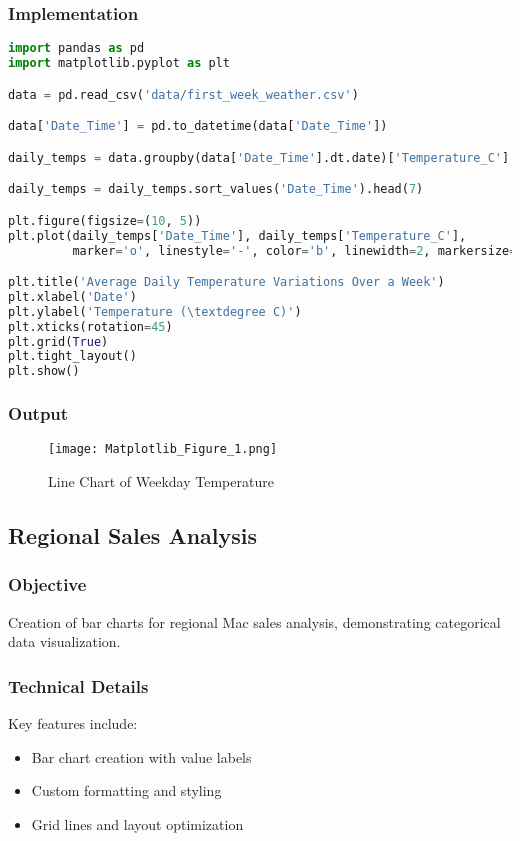 \documentclass[12pt]{article}
\begin{document}
\subsubsection{Implementation}
\begin{lstlisting}[language=Python, caption=Temperature Analysis Implementation]
import pandas as pd
import matplotlib.pyplot as plt

data = pd.read_csv('data/first_week_weather.csv')

data['Date_Time'] = pd.to_datetime(data['Date_Time'])

daily_temps = data.groupby(data['Date_Time'].dt.date)['Temperature_C'].mean().reset_index()

daily_temps = daily_temps.sort_values('Date_Time').head(7)

plt.figure(figsize=(10, 5))
plt.plot(daily_temps['Date_Time'], daily_temps['Temperature_C'], 
         marker='o', linestyle='-', color='b', linewidth=2, markersize=8)

plt.title('Average Daily Temperature Variations Over a Week')
plt.xlabel('Date')
plt.ylabel('Temperature (\textdegree C)')
plt.xticks(rotation=45)
plt.grid(True)
plt.tight_layout()
plt.show()

\end{lstlisting}
\newpage
\subsubsection{Output}
\begin{figure}[h]
    \centering
    \texttt{[image: Matplotlib\_Figure\_1.png]}
    \caption{Line Chart of Weekday Temperature}
    \label{fig:enter-label}
\end{figure}

\subsection{Regional Sales Analysis\hfill\href{https://github.com/sabbirahmed404/Python-Practice/blob/main/matplotlib_2.py}{\faGithub}}
\subsubsection{Objective}
Creation of bar charts for regional Mac sales analysis, demonstrating categorical data visualization.

\subsubsection{Technical Details}
Key features include:
\begin{itemize}
    \item Bar chart creation with value labels
    \item Custom formatting and styling
    \item Grid lines and layout optimization
\end{itemize}
\end{document}
